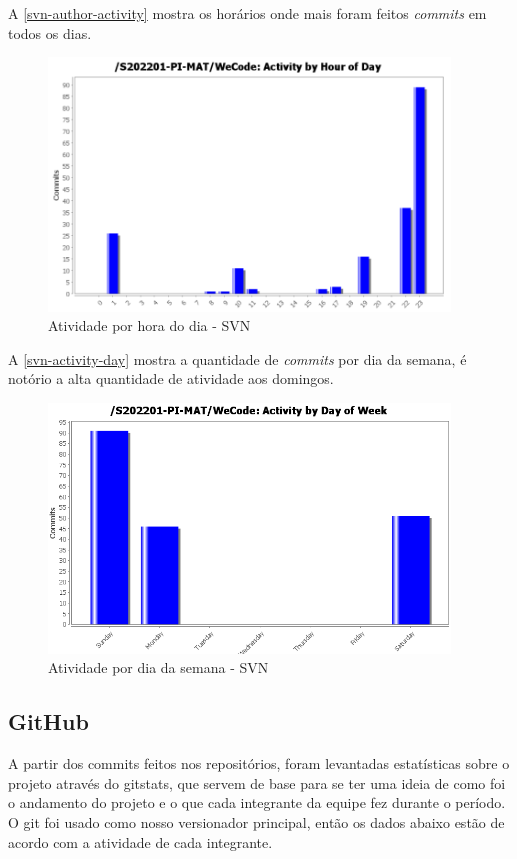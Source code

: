 A \autoref{svn-author-activity} mostra os horários onde mais foram feitos \emph{commits} em todos os dias.
\begin{figure}[H]
	\centering
	\caption{\label{svn-activity-hour}Atividade por hora do dia - SVN}
	\includegraphics[width=0.95\textwidth]{../imagens/stats/svn-activity-hour.png}
\end{figure}

A \autoref{svn-activity-day} mostra a quantidade de \emph{commits} por dia da semana, é notório a alta quantidade de atividade aos domingos.
\begin{figure}[H]
	\centering
	\caption{\label{svn-activity-day}Atividade por dia da semana - SVN}
	\includegraphics[width=0.95\textwidth]{../imagens/stats/svn-activity-day.png}
\end{figure}

\subsection{GitHub}
A partir dos commits feitos nos repositórios, foram levantadas estatísticas sobre o projeto através do \gls{gitstats}, que servem de base para se ter uma ideia de como foi o andamento do projeto e o que cada integrante da equipe fez durante o período.
O \gls{git} foi usado como nosso versionador principal, então os dados abaixo estão de acordo com a atividade de cada integrante.

